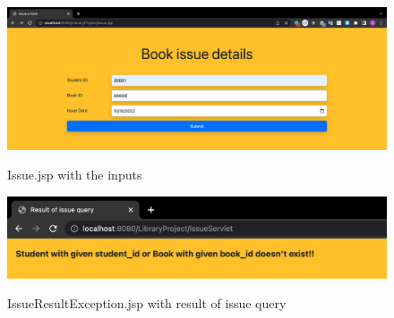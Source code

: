 \documentclass[12pt]{article}
\begin{document}
\begin{figure}[!hbt]
    \centering
    \includegraphics[scale=0.34]{screenshots/b3_16.png}
    \label{fig:my_label1}
    \caption{Issue.jsp with the inputs}
\end{figure}
\vspace{2cm}
\begin{figure}[!hbt]
    \centering
    \includegraphics[scale=0.69]{screenshots/b3_17.png}
    \label{fig:my_label1}
    \caption{IssueResultException.jsp with result of issue query}
\end{figure}

\newpage
\end{document}
